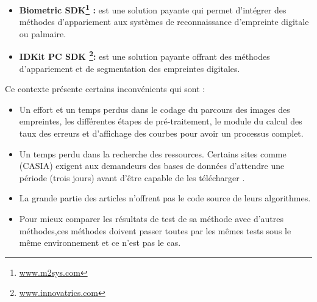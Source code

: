 \begin{itemize}
	\item \textbf{
		Biometric SDK\footnote{\href{http://www.m2sys.com/}{www.m2sys.com}} :} est une solution payante qui permet d’intégrer des méthodes d’appariement aux systèmes de reconnaissance d’empreinte digitale ou palmaire.
	
	\item \textbf{IDKit PC SDK \footnote{\href{https://www.innovatrics.com/idkit-fingerprint-sdk/}{www.innovatrics.com}}:} est une solution payante offrant des méthodes d’appariement et de segmentation des empreintes digitales.
	
	
\end{itemize}



Ce contexte présente certains inconvénients qui sont :
\begin{itemize}
	\item Un effort et un temps perdus dans le codage du parcours des images des empreintes, les différentes étapes de pré-traitement, le module du calcul des taux des erreurs et d'affichage des courbes pour avoir un processus complet.
	\item Un temps perdu dans la recherche des ressources.
	Certains sites comme (CASIA) exigent aux demandeurs des bases de données d’attendre une période (trois jours) avant d’être capable de les télécharger .
	\item La grande partie des articles n’offrent pas le code source de leurs algorithmes.
	\item Pour mieux comparer les résultats de test de sa méthode avec d'autres méthodes,ces méthodes doivent passer toutes par les mêmes tests sous le même environnement et ce n'est pas le cas.
\end{itemize}


